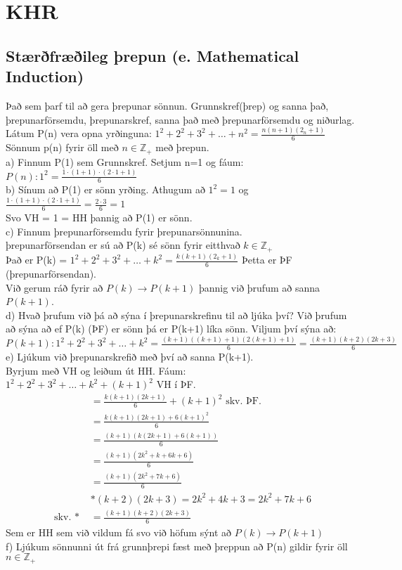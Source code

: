 \section{KHR}
\subsection{Stærðfræðileg þrepun (e. Mathematical Induction)}
Það sem þarf til að gera þrepunar sönnun. Grunnskref(þrep) og sanna það, þrepunarförsemdu, þrepunarskref, sanna það með þrepunarförsemdu og niðurlag.\vspace*{1em} \\
Látum P(n) vera opna yrðinguna: $1^2 + 2^2 + 3^2 + \ldots + n^2 = \frac{n(n+1)(2_n+1)}{6}$\\
Sönnum p(n) fyrir öll með $n \in \mathbb{Z_+}$ með þrepun.\\
a) Finnum P(1) sem Grunnskref. Setjum n=1 og fáum:\\
$P(n): 1^2 = \frac{1\cdot(1+1)\cdot(2\cdot1+1)}{6}$\\
b) Sínum að P(1) er sönn yrðing. Athugum að $1^2 = 1$ og $\frac{1\cdot(1+1)\cdot(2\cdot1+1)}{6} = \frac{2\cdot3}{6} = 1$\\
Svo VH = 1 = HH þannig að P(1) er sönn.\\
c) Finnum þrepunarförsemdu fyrir þrepunarsönnunina.\\
þrepunarförsendan er sú að P(k) sé sönn fyrir eitthvað $k \in \mathbb{Z_+}$\\
Það er P(k) = $1^2 + 2^2 + 3^2 + \ldots + k^2 = \frac{k(k+1)(2_k+1)}{6}$ Þetta er ÞF (þrepunarförsendan).\\
Við gerum ráð fyrir að $P(k) \rightarrow P(k+1)$ þannig við þrufum að sanna $P(k+1)$.\\
d) Hvað þrufum við þá að sýna í þrepunarskrefinu til að ljúka því? Við þrufum að sýna að ef P(k) (ÞF) er sönn þá er P(k+1) líka sönn. Viljum því sýna að:\\ 
$P(k+1): 1^2 + 2^2 + 3^2 + \ldots + k^2 = \frac{(k+1)((k+1)+1)(2(k+1)+1)}{6} = \frac{(k+1)(k+2)(2k+3)}{6}$\\
e) Ljúkum við þrepunarskrefið með því að sanna P(k+1).\\
Byrjum með VH og leiðum út HH. Fáum:\\
$1^2 + 2^2 + 3^2 + \ldots + k^2 + (k+1)^2$ VH í ÞF.
\begin{align*}
    &= \frac{k(k+1)(2k+1)}{6} + (k+1)^2 \text{ skv. ÞF.}\\
    &= \frac{k(k+1)(2k+1)+6(k+1)^2}{6} \\
    &= \frac{(k+1)(k(2k+1)+6(k+1))}{6} \\
    &= \frac{(k+1)(2k^2+k+6k+6)}{6} \\
    &= \frac{(k+1)(2k^2+7k+6)}{6}\\
    &*(k+2)(2k+3) = 2k^2 + 4k+3 = 2k^2 + 7k + 6\\
    \text{skv. * }&= \frac{(k+1)(k+2)(2k+3)}{6}
\end{align*}
Sem er HH sem við vildum fá svo við höfum sýnt að $P(k) \rightarrow P(k+1)$\\
f) Ljúkum sönnunni út frá grunnþrepi fæst með þreppun að P(n) gildir fyrir öll $n \in \mathbb{Z_+}$

